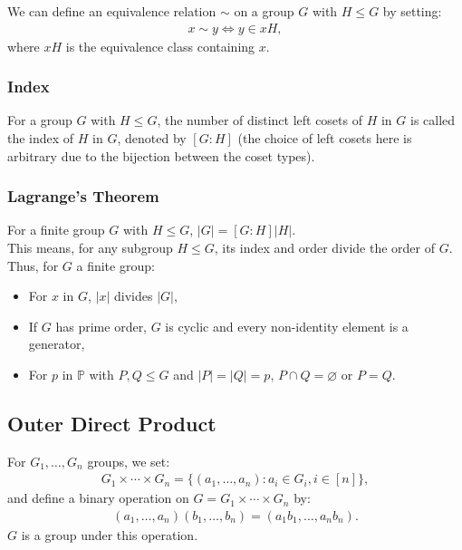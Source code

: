 We can define an equivalence relation $\sim$ on a group $G$ with $H \leq G$ 
by setting: \begin{align*}
    x \sim y \Longleftrightarrow y \in xH,
\end{align*} where $xH$ is the equivalence class containing $x$.

\subsubsection{Index}

For a group $G$ with $H \leq G$, the number of distinct left cosets of $H$
in $G$ is called the index of $H$ in $G$, denoted by $[G : H]$ (the choice
of left cosets here is arbitrary due to the bijection between the coset types).

\subsubsection{Lagrange's Theorem}

For a finite group $G$ with $H \leq G$, $|G| = [G : H]|H|$.
\\[\baselineskip]
This means, for any subgroup $H \leq G$, its index and order divide the 
order of $G$. Thus, for $G$ a finite group: \begin{itemize}
    \item For $x$ in $G$, $|x|$ divides $|G|$,
    \item If $G$ has prime order, $G$ is cyclic and every
        non-identity element is a generator,
    \item For $p$ in $\mathbb{P}$ with $P, Q \leq G$ and $|P| = |Q| = p$,
        $P \cap Q = \varnothing$ or $P = Q$.
\end{itemize}

\subsection{Outer Direct Product}

For $G_1, \ldots, G_n$ groups, we set: \begin{align*}
    G_1 \times \cdots \times G_n = \{(a_1, \ldots, a_n) : a_i \in G_i, i \in [n] \},
\end{align*} and define a binary operation on 
$G = G_1 \times \cdots \times G_n$ by: \begin{align*}
    (a_1, \ldots, a_n)(b_1, \ldots, b_n) = (a_1b_1, \ldots, a_nb_n).
\end{align*} $G$ is a group under this operation.

